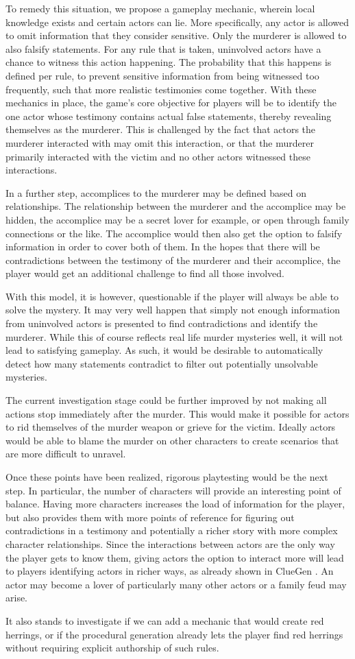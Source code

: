 To remedy this situation, we propose a gameplay mechanic, wherein local knowledge exists and certain actors can lie.
More specifically, any actor is allowed to omit information that they consider sensitive.
Only the murderer is allowed to also falsify statements.
For any rule that is taken, uninvolved actors have a chance to witness this action happening.
The probability that this happens is defined per rule, to prevent sensitive information from being witnessed too frequently, such that more realistic testimonies come together.
With these mechanics in place, the game's core objective for players will be to identify the one actor whose testimony contains actual false statements, thereby revealing themselves as the murderer.
This is challenged by the fact that actors the murderer interacted with may omit this interaction, or that the murderer primarily interacted with the victim and no other actors witnessed these interactions.

In a further step, accomplices to the murderer may be defined based on relationships.
The relationship between the murderer and the accomplice may be hidden, the accomplice may be a secret lover for example, or open through family connections or the like.
The accomplice would then also get the option to falsify information in order to cover both of them.
In the hopes that there will be contradictions between the testimony of the murderer and their accomplice, the player would get an additional challenge to find all those involved.

With this model, it is however, questionable if the player will always be able to solve the mystery.
It may very well happen that simply not enough information from uninvolved actors is presented to find contradictions and identify the murderer.
While this of course reflects real life murder mysteries well, it will not lead to satisfying gameplay.
As such, it would be desirable to automatically detect how many statements contradict to filter out potentially unsolvable mysteries.

The current investigation stage could be further improved by not making all actions stop immediately after the murder.
This would make it possible for actors to rid themselves of the murder weapon or grieve for the victim.
Ideally actors would be able to blame the murder on other characters to create scenarios that are more difficult to unravel.

Once these points have been realized, rigorous playtesting would be the next step.
In particular, the number of characters will provide an interesting point of balance.
Having more characters increases the load of information for the player, but also provides them with more points of reference for figuring out contradictions in a testimony and potentially a richer story with more complex character relationships.
Since the interactions between actors are the only way the player gets to know them, giving actors the option to interact more will lead to players identifying actors in richer ways, as already shown in ClueGen \cite{stockdale_2016}.
An actor may become a lover of particularly many other actors or a family feud may arise.

It also stands to investigate if we can add a mechanic that would create red herrings, or if the procedural generation already lets the player find red herrings without requiring explicit authorship of such rules.
